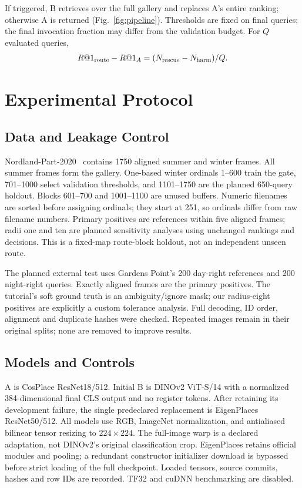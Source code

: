 \documentclass[conference]{IEEEtran}
\begin{document}
If triggered, B retrieves over the full gallery and replaces A's entire
ranking; otherwise A is returned (Fig.~\ref{fig:pipeline}). Thresholds are
fixed on final queries; the final invocation fraction may differ from the
validation budget. For $Q$ evaluated queries,
\begin{equation}
R@1_{\rm route}-R@1_A=(N_{\rm rescue}-N_{\rm harm})/Q.
\end{equation}

\section{Experimental Protocol}
\subsection{Data and Leakage Control}
Nordland-Part-2020~\cite{nordland} contains 1750 aligned summer and winter
frames. All summer frames form the gallery. One-based winter ordinals
1--600 train the gate, 701--1000 select validation thresholds, and
1101--1750 are the planned 650-query holdout. Blocks 601--700 and
1001--1100 are unused buffers. Numeric filenames are sorted before
assigning ordinals; they start at 251, so ordinals differ from raw filename
numbers. Primary positives are references within five aligned frames;
radii one and ten are planned sensitivity analyses using unchanged
rankings and decisions. This is a fixed-map route-block holdout, not an
independent unseen route.

The planned external test uses Gardens Point's 200 day-right references
and 200 night-right queries. Exactly aligned frames are the primary
positives. The tutorial's soft ground truth is an ambiguity/ignore mask;
our radius-eight positives are explicitly a custom tolerance analysis.
Full decoding, ID order, alignment and duplicate hashes were checked.
Repeated images remain in their original splits; none are removed to
improve results.

\subsection{Models and Controls}
A is CosPlace ResNet18/512. Initial B is DINOv2 ViT-S/14 with a normalized
384-dimensional final CLS output and no register tokens. After retaining
its development failure, the single predeclared replacement is
EigenPlaces ResNet50/512. All models use RGB, ImageNet normalization,
and antialiased bilinear tensor resizing to $224\times224$. The full-image
warp is a declared adaptation, not DINOv2's original classification crop.
EigenPlaces retains official modules and pooling; a redundant constructor
initializer download is bypassed before strict loading of the full
checkpoint. Loaded tensors, source commits, hashes and row IDs are
recorded. TF32 and cuDNN benchmarking are disabled.
\end{document}
